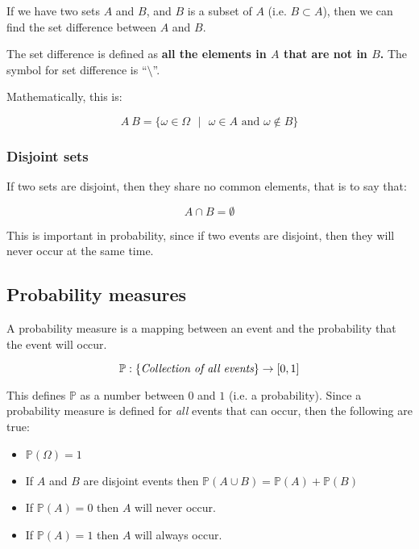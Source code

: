 If we have two sets $A$ and $B$, and $B$ is a subset of $A$ (i.e. $B \subset
A$), then we can find the set difference between $A$ and $B$.

The set difference is defined as {\bf all the elements in $A$ that are not in
$B$.} The symbol for set difference is ``$\setminus$''.

Mathematically, this is:

\begin{dmath*}
	{A \ B = \{\omega \in \Omega \textrm{ } \vert \textrm{ } \omega \in A \textrm{ and } \omega \not\in B\}}
\end{dmath*}

\subsubsection{Disjoint sets}

If two sets are disjoint, then they share no common elements, that is to say
that:

\begin{dmath*}
	A \cap B = \emptyset
\end{dmath*}

This is important in probability, since if two events are disjoint, then they
will never occur at the same time.

\subsection{Probability measures}

A probability measure is a mapping between an event and the probability that the
event will occur.

\begin{dmath*}
	\mathbb{P} : \{\textrm{\it Collection of all events}\} \rightarrow [0,1]
\end{dmath*}

This defines $\mathbb{P}$ as a number between $0$ and $1$ (i.e. a probability).
Since a probability measure is defined for {\it all} events that can occur, then
the following are true:

\begin{itemize}
	\item $\mathbb{P}(\Omega) = 1$
	\item If $A$ and $B$ are disjoint events then $\mathbb{P}(A \cup B) = \mathbb{P}(A) + \mathbb{P}(B)$
	\item If $\mathbb{P}(A) = 0$ then $A$ will never occur.
	\item If $\mathbb{P}(A) = 1$ then $A$ will always occur.
\end{itemize}

